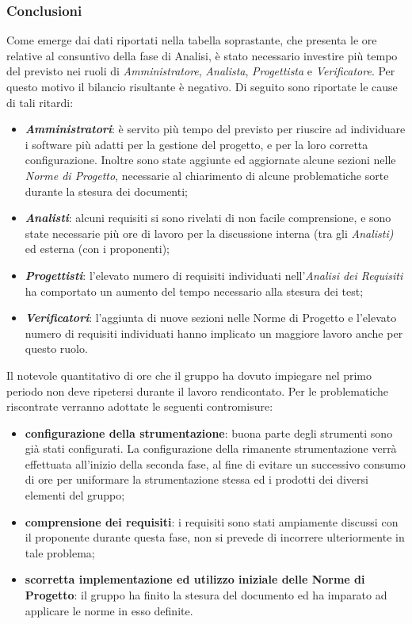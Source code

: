 \subsubsection{Conclusioni}
Come emerge dai dati riportati nella tabella soprastante, che presenta le ore relative al consuntivo della fase di Analisi, è stato necessario investire più tempo del previsto nei ruoli di \textit{Amministratore}, \textit{Analista}, \textit{Progettista} e \textit{Verificatore}. Per questo motivo il bilancio risultante è negativo. Di seguito sono riportate le cause di tali ritardi:
\begin{itemize}
	\item \textbf{\textit{Amministratori}}: è servito più tempo del previsto per riuscire ad individuare i software più adatti per la gestione del progetto, e per la loro corretta configurazione. Inoltre sono state aggiunte ed aggiornate alcune sezioni nelle \textit{Norme di Progetto}, necessarie al chiarimento di alcune problematiche sorte durante la stesura dei documenti;
	\item \textbf{\textit{Analisti}}: alcuni requisiti si sono rivelati di non facile comprensione, e sono state necessarie più ore di lavoro per la discussione interna (tra gli \textit{Analisti)} ed esterna (con i proponenti); 
	\item \textbf{\textit{Progettisti}}: l'elevato numero di requisiti individuati nell'\textit{Analisi dei Requisiti} ha comportato un aumento del tempo necessario alla stesura dei test;
	\item \textbf{\textit{Verificatori}}: l'aggiunta di nuove sezioni nelle Norme di Progetto e l'elevato numero di requisiti individuati hanno implicato un maggiore lavoro anche per questo ruolo. 
\end{itemize}
Il notevole quantitativo di ore che il gruppo ha dovuto impiegare nel primo periodo non deve ripetersi durante il lavoro rendicontato. Per le problematiche riscontrate verranno adottate le seguenti contromisure:
\begin{itemize}
	\item \textbf{configurazione della strumentazione}: buona parte degli strumenti sono già stati configurati. La configurazione della rimanente strumentazione verrà effettuata all'inizio della seconda fase, al fine di evitare un successivo consumo di ore per uniformare la strumentazione stessa ed i prodotti dei diversi elementi del gruppo;
	\item \textbf{comprensione dei requisiti}: i requisiti sono stati ampiamente discussi con il proponente durante questa fase, non si prevede di incorrere ulteriormente in tale problema;
	\item \textbf{scorretta implementazione ed utilizzo iniziale delle Norme di Progetto}: il gruppo ha finito la stesura del documento ed ha imparato ad applicare le norme in esso definite.
\end{itemize}

